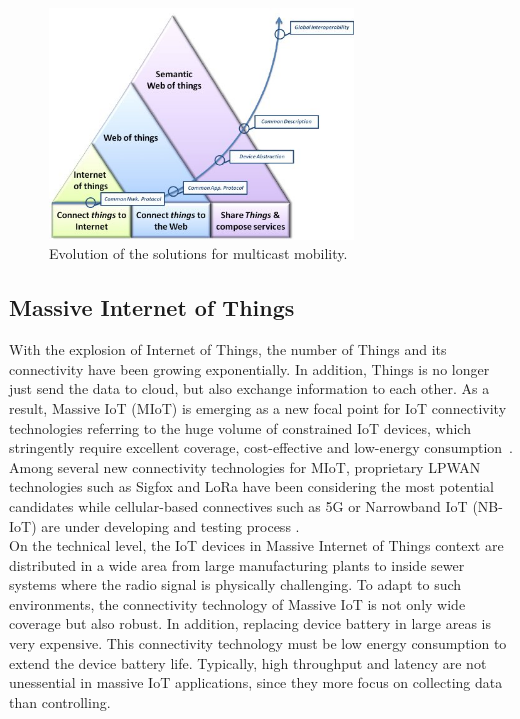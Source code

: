 \begin{figure}[h!] 
 \begin{center} 
 \includegraphics[width=0.72\textwidth]{./Part1/Chapter2/figures/c3_evolution_iot_swot.jpg} 
    \caption{Evolution of the solutions for multicast mobility.~\cite{jara2014semantic}}
     \label{fig:c2_evolution_iot_swot}
  \end{center} 
\end{figure}

\subsection{Massive Internet of Things}

With the explosion of Internet of Things, the number of Things and its connectivity have been growing exponentially. In addition, Things is no longer just send the data to cloud, but also exchange information to each other. As a result, Massive IoT (MIoT) is emerging as a new focal point for IoT connectivity technologies referring to the huge volume of constrained IoT devices, which stringently require excellent coverage, cost-effective and low-energy consumption~\cite{Northstream2017}. Among several new connectivity technologies for MIoT, proprietary LPWAN technologies such as Sigfox and LoRa have been considering the most potential candidates while cellular-based connectives such as 5G or Narrowband IoT (NB-IoT) are under developing and testing process \cite{raza2017low}.\\

On the technical level, the IoT devices in Massive Internet of Things context are distributed in a wide area from large manufacturing plants to inside sewer systems where the radio signal is physically challenging. To adapt to such environments, the connectivity technology of Massive IoT is not only wide coverage but also robust. In addition, replacing device battery in large areas is very expensive. This connectivity technology must be low energy consumption to extend the device battery life. Typically, high throughput and latency are not unessential in massive IoT applications, since they more focus on collecting data than controlling.

